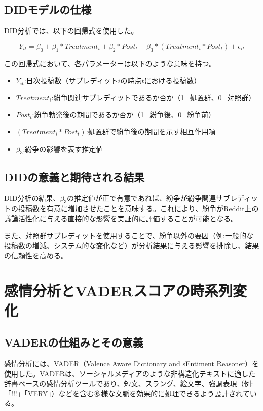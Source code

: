 \documentclass[11pt, a4j]{jreport}
\begin{document}
    \subsection{DIDモデルの仕様}
    DID分析では、以下の回帰式を使用した。

    \begin{equation}
        Y_{it} = \beta_{0} + \beta_{1}*Treatment_{i} + \beta_{2}*Post_{t} + \beta_{3}*(Treatment_{i} * Post_{t}) + \epsilon_{it}
    \end{equation}

    この回帰式において、各パラメーターは以下のような意味を持つ。
    \begin{itemize}
        \item $Y_{it}$:日次投稿数（サブレディット$i$の時点$t$における投稿数）
        \item $Treatment_{i}$:紛争関連サブレディットであるか否か（1=処置群、0=対照群）
        \item $Post_{t}$:紛争勃発後の期間であるか否か（1=紛争後、0=紛争前）
        \item $(Treatment_{i} * Post_{t})$:処置群で紛争後の期間を示す相互作用項
        \item $\beta_{3}$:紛争の影響を表す推定値
    \end{itemize}

    \subsection{DIDの意義と期待される結果}
    DID分析の結果、$\beta_{3}$の推定値が正で有意であれば、紛争が紛争関連サブレディットの投稿数を有意に増加させたことを意味する。これにより、紛争がReddit上の議論活性化に与える直接的な影響を実証的に評価することが可能となる。

    また、対照群サブレディットを使用することで、紛争以外の要因（例:一般的な投稿数の増減、システム的な変化など）が分析結果に与える影響を排除し、結果の信頼性を高める。

    \section{感情分析とVADERスコアの時系列変化}

    \subsection{VADERの仕組みとその意義}
    感情分析には、VADER（Valence Aware Dictionary and sEntiment Reasoner）を使用した。VADERは、ソーシャルメディアのような非構造化テキストに適した辞書ベースの感情分析ツールであり、短文、スラング、絵文字、強調表現（例:「!!!」「VERY」）などを含む多様な文脈を効果的に処理できるよう設計されている。
\end{document}
